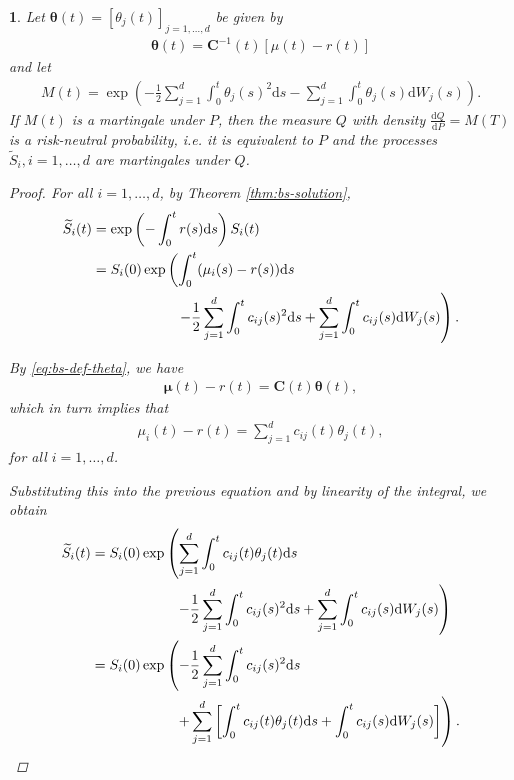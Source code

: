 \documentclass[english]{article}
\newcommand{\comment}[1]{\color{blue}#1\color{black}}
\numberwithin{equation}{section}
\numberwithin{figure}{section}
\theoremstyle{bolddescit}
\newtheorem{theorem}{\protect\theoremname}[section]
\theoremstyle{definition}
\theoremstyle{definition}
\theoremstyle{plain}
\theoremstyle{plain}
\theoremstyle{bolddesc}
\theoremstyle{plain}
\theoremstyle{remark}
\providecommand{\theoremname}{Theorem}
\begin{document}
\begin{theorem}
  Let $\mathbf{\theta}(t) = [\theta_j(t)]_{j=1,\ldots,d}$ be given by
  \begin{align}\label{eq:bs-def-theta}
    \mathbf{\theta}(t) = \mathbf{C}^{-1}(t) [\mu(t) - r(t)]
  \end{align}
  and let
  \begin{align*}
    M(t) = \exp \left( - \frac{1}{2} \sum_{j=1}^d \int_0^t \theta_j(s)^2 \mathrm{d}s - \sum_{j=1}^d \int_0^t \theta_j(s) \mathrm{d}W_j(s) \right).
  \end{align*}
  If $M(t)$ is a martingale under $P$, then the measure $Q$ with density $\frac{\mathrm{d}Q}{\mathrm{d}P} = M(T)$ is a risk-neutral probability, i.e. it is equivalent to $P$ and the processes $\widetilde{S}_i, i=1,\ldots,d$ are martingales under $Q$.

  \begin{proof}
    For all $i=1,\ldots,d$, by Theorem \ref{thm:bs-solution},
    \begin{align*}
      \widetilde{S}_i(t)
      &= \exp\left(- \int_0^t r(s)\mathrm{d}s\right) S_i(t)\\
      &= S_i(0) \exp \left( \int_0^t (\mu_i(s) - r(s)) \mathrm{d}s \right.\\
      &\hspace*{60pt} \left. - \frac{1}{2} \sum_{j=1}^{d} \int_0^t c_{ij}(s)^2 \mathrm{d}s + \sum_{j=1}^d \int_0^t c_{ij}(s) \mathrm{d}W_j(s) \right).
    \end{align*}

    By \eqref{eq:bs-def-theta}, we have
    \begin{align*}
      \mathbf{\mu}(t) - r(t) = \mathbf{C}(t) \mathbf{\theta}(t),
    \end{align*}
    which in turn implies that
    \begin{align*}
      \mu_i(t) - r(t) = \sum_{j=1}^d c_{ij}(t) \theta_j(t),
    \end{align*}
    for all $i=1,\ldots,d$.

    Substituting this into the previous equation and by linearity of the integral, we obtain
    \begin{align}
      \widetilde{S}_i(t)
      &= S_i(0) \exp \left( \sum_{j=1}^d \int_0^t c_{ij}(t) \theta_j(t) \mathrm{d}s \right.\notag\\
      &\hspace*{60pt} \left. - \frac{1}{2} \sum_{j=1}^{d} \int_0^t c_{ij}(s)^2 \mathrm{d}s + \sum_{j=1}^d \int_0^t c_{ij}(s) \mathrm{d}W_j(s) \right)\notag\\
      &= S_i(0) \exp \left( - \frac{1}{2} \sum_{j=1}^{d} \int_0^t c_{ij}(s)^2 \mathrm{d}s \right.\notag\\
      &\hspace*{60pt} \left. + \sum_{j=1}^d \left[\int_0^t c_{ij}(t) \theta_j(t) \mathrm{d}s + \int_0^t c_{ij}(s) \mathrm{d}W_j(s) \right]\right).\label{eq:bs-risk-neutral-before-product-rule}
    \end{align}


\end{proof}
\end{theorem}
\end{document}
